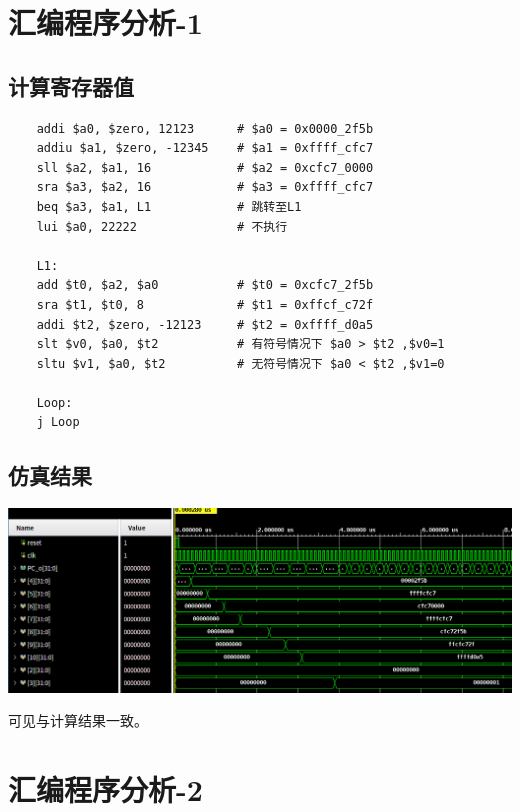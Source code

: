 \documentclass{article}
\begin{document}
\section{汇编程序分析-1}
\subsection{计算寄存器值}
\begin{lstlisting}
    addi $a0, $zero, 12123      # $a0 = 0x0000_2f5b
    addiu $a1, $zero, -12345    # $a1 = 0xffff_cfc7
    sll $a2, $a1, 16            # $a2 = 0xcfc7_0000
    sra $a3, $a2, 16            # $a3 = 0xffff_cfc7
    beq $a3, $a1, L1            # 跳转至L1
    lui $a0, 22222              # 不执行

    L1:
    add $t0, $a2, $a0           # $t0 = 0xcfc7_2f5b
    sra $t1, $t0, 8             # $t1 = 0xffcf_c72f
    addi $t2, $zero, -12123     # $t2 = 0xffff_d0a5
    slt $v0, $a0, $t2           # 有符号情况下 $a0 > $t2 ,$v0=1
    sltu $v1, $a0, $t2          # 无符号情况下 $a0 < $t2 ,$v1=0

    Loop:
    j Loop
\end{lstlisting}
\subsection{仿真结果}
\begin{center}
    \includegraphics[width = 16cm]{images/sim_1_waveform.png}
\end{center}
可见与计算结果一致。

\section{汇编程序分析-2}
\end{document}
